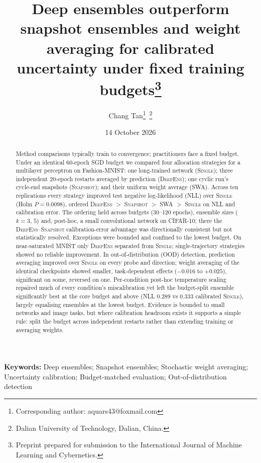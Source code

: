 \documentclass[11pt,a4paper]{article}
\newcommand{\deepens}{\textsc{DeepEns}}
\newcommand{\snapshot}{\textsc{Snapshot}}
\newcommand{\swa}{\textsc{SWA}}
\newcommand{\single}{\textsc{Single}}
\begin{document}
\title{Deep ensembles outperform snapshot ensembles and weight
averaging for calibrated uncertainty under fixed training
budgets\thanks{Preprint prepared for submission
to the International Journal of Machine Learning and Cybernetics.}}
\author{Chang Tan\thanks{Corresponding author: aquars43@foxmail.com}\,%
\thanks{Dalian University of Technology, Dalian, China.}}
\date{14 October 2026}
\maketitle

\begin{abstract}
\noindent Method comparisons typically train to convergence;
practitioners face a fixed budget.
Under an identical 60-epoch SGD budget we compared
four allocation strategies for a multilayer perceptron on Fashion-MNIST:
one long-trained network (\single); three independent 20-epoch restarts
averaged by prediction (\deepens); one cyclic run's
cycle-end snapshots (\snapshot); and their uniform weight average
(\swa). Across ten replications every strategy improved test
negative log-likelihood (NLL) over \single{} (Holm $P=0.0098$),
ordered \deepens{} $>$ \snapshot{} $>$ \swa{} $>$ \single{} on
NLL and calibration error. The ordering held across budgets
(30--120 epochs), ensemble sizes ($k=3$, $5$) and, post-hoc, a small
convolutional network on CIFAR-10; there the \deepens{}--\snapshot{}
calibration-error advantage was directionally consistent but not
statistically resolved. Exceptions were bounded and confined to the
lowest budget. On near-saturated MNIST only \deepens{} separated from
\single{}; single-trajectory strategies showed no reliable
improvement. In out-of-distribution (OOD) detection, prediction averaging
improved over \single{} on every probe and direction; weight averaging of
the identical checkpoints showed smaller, task-dependent effects
($-0.016$ to $+0.025$), significant on some, reversed on one.
Per-condition post-hoc temperature scaling repaired much of every
condition's miscalibration yet left the budget-split ensemble
significantly best at the core budget and above (NLL 0.289 vs 0.333
calibrated \single{}), largely equalising ensembles at the lowest budget.
Evidence is bounded to small networks and image tasks, but where
calibration headroom exists it supports a simple rule: split the
budget across independent restarts rather than extending training or
averaging weights.
\end{abstract}

\vspace{2pt}
\noindent\textbf{Keywords:} Deep ensembles; Snapshot ensembles; Stochastic
weight averaging; Uncertainty calibration; Budget-matched evaluation;
Out-of-distribution detection
\end{document}
